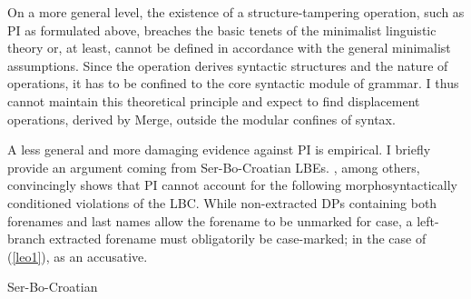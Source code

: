 \documentclass[output=paper]{langsci/langscibook}
\begin{document}
On a more general level, the existence of a stru\-cture-tampering operation,
such as \gls{PI} as formulated above, breaches the basic tenets of the
minimalist linguistic theory or, at least, cannot be defined in  accordance
with the general minimalist assumptions. Since the  operation derives
syntactic structures and the nature of  operations, it has to be
confined to the core syntactic module of grammar. I thus cannot maintain this
theoretical principle and expect to find displacement operations, derived by
Merge, outside the modular confines of syntax.

A less general and more damaging evidence against \gls{PI} is empirical. I
briefly provide an argument coming from Ser-Bo-Croatian
\glspl{LBE}. \citet{Boskovic:2009b}, among others, convincingly shows that
\gls{PI} cannot account for the following morphosyntactically conditioned
violations of the \gls{LBC}. While non-extracted DPs containing both forenames
and last names allow the forename to be unmarked for case, a left-branch
extracted forename must obligatorily be case-marked;
in the case of (\ref{leo1}), as an accusative.

\begin{exe}
\ex Ser-Bo-Croatian
\begin{xlista}
\ex
\begin{xlisti}


\end{xlisti}

\ex
\begin{xlisti}

\end{xlisti}

\end{xlista}
	\label{leo1}
\end{exe}
\end{document}
